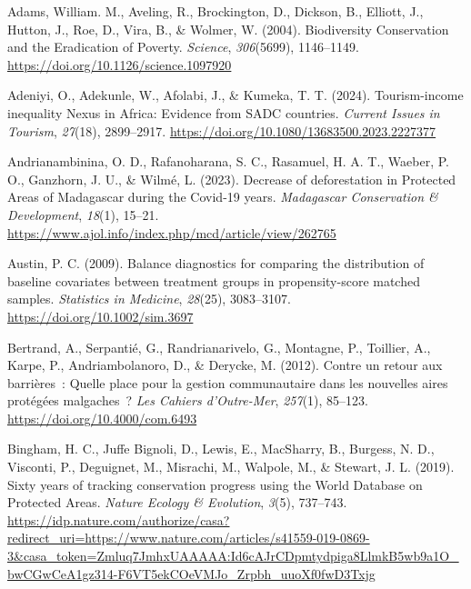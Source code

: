 \documentclass[
]{article}
\newlength{\cslhangindent}
\newenvironment{CSLReferences}[2] %
 {\begin{list}{}{%
  \setlength{\itemindent}{0pt}
  \setlength{\leftmargin}{0pt}
  \setlength{\parsep}{0pt}
  \ifodd #1
   \setlength{\leftmargin}{\cslhangindent}
   \setlength{\itemindent}{-1\cslhangindent}
  \fi
  \setlength{\itemsep}{#2\baselineskip}}}
 {\end{list}}
\begin{document}
\label{refs}
\begin{CSLReferences}{1}{0}
Adams, William. M., Aveling, R., Brockington, D., Dickson, B., Elliott,
J., Hutton, J., Roe, D., Vira, B., \& Wolmer, W. (2004). Biodiversity
{Conservation} and the {Eradication} of {Poverty}. \emph{Science},
\emph{306}(5699), 1146--1149.
\url{https://doi.org/10.1126/science.1097920}

Adeniyi, O., Adekunle, W., Afolabi, J., \& Kumeka, T. T. (2024).
Tourism-income inequality {Nexus} in {Africa}: Evidence from {SADC}
countries. \emph{Current Issues in Tourism}, \emph{27}(18), 2899--2917.
\url{https://doi.org/10.1080/13683500.2023.2227377}

Andrianambinina, O. D., Rafanoharana, S. C., Rasamuel, H. A. T., Waeber,
P. O., Ganzhorn, J. U., \& Wilmé, L. (2023). Decrease of deforestation
in {Protected} {Areas} of {Madagascar} during the {Covid}-19 years.
\emph{Madagascar Conservation \& Development}, \emph{18}(1), 15--21.
\url{https://www.ajol.info/index.php/mcd/article/view/262765}

Austin, P. C. (2009). Balance diagnostics for comparing the distribution
of baseline covariates between treatment groups in propensity-score
matched samples. \emph{Statistics in Medicine}, \emph{28}(25),
3083--3107. \url{https://doi.org/10.1002/sim.3697}

Bertrand, A., Serpantié, G., Randrianarivelo, G., Montagne, P.,
Toillier, A., Karpe, P., Andriambolanoro, D., \& Derycke, M. (2012).
Contre un retour aux barrières~: Quelle place pour la gestion
communautaire dans les nouvelles aires protégées malgaches~? \emph{Les
Cahiers d'Outre-Mer}, \emph{257}(1), 85--123.
\url{https://doi.org/10.4000/com.6493}

Bingham, H. C., Juffe Bignoli, D., Lewis, E., MacSharry, B., Burgess, N.
D., Visconti, P., Deguignet, M., Misrachi, M., Walpole, M., \& Stewart,
J. L. (2019). Sixty years of tracking conservation progress using the
{World} {Database} on {Protected} {Areas}. \emph{Nature Ecology \&
Evolution}, \emph{3}(5), 737--743.
\url{https://idp.nature.com/authorize/casa?redirect_uri=https://www.nature.com/articles/s41559-019-0869-3&casa_token=Zmluq7JmhxUAAAAA:Id6cAJrCDpmtydpiga8LlmkB5wb9a1O_bwCGwCeA1gz314-F6VT5ekCOeVMJo_Zrpbh_uuoXf0fwD3Txjg}


\end{CSLReferences}
\end{document}
